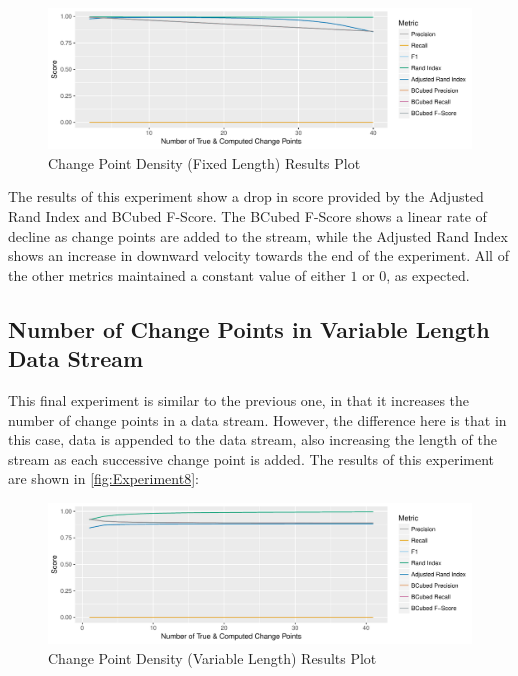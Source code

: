 \documentclass{uvamscse}	%
\begin{document}
\begin{figure}[h]
    \includegraphics[width=\textwidth]{figures/Experiment8}
    \caption{Change Point Density (Fixed Length) Results Plot}
    \label{fig:Experiment7}
\end{figure}

The results of this experiment show a drop in score provided by the Adjusted Rand Index and BCubed F-Score. The BCubed F-Score shows a linear rate of decline as change points are added to the stream, while the Adjusted Rand Index shows an increase in downward velocity towards the end of the experiment. All of the other metrics maintained a constant value of either $1$ or $0$, as expected.

\subsection{Number of Change Points in Variable Length Data Stream}

This final experiment is similar to the previous one, in that it increases the number of change points in a data stream. However, the difference here is that in this case, data is appended to the data stream, also increasing the length of the stream as each successive change point is added. The results of this experiment are shown in \autoref{fig:Experiment8}:

\begin{figure}[H]
    \includegraphics[width=\textwidth]{figures/Experiment7}
    \caption{Change Point Density (Variable Length) Results Plot}
    \label{fig:Experiment8}
\end{figure}
\end{document}
